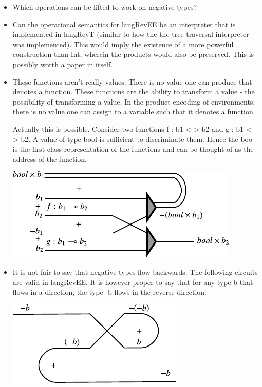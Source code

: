 \documentclass[preprint]{sigplanconf}
\begin{document}
{\begin{itemize}
\item Which operations can be lifted to work on negative types?

\item Can the operational semantics for {{langRevEE}} be an
  interpreter that is implemented in {{langRevT}} (similar to how the
  the tree traversal interpreter was implemented). This would imply
  the existence of a more powerful construction than Int, wherein the
  products would also be preserved. This is possibly worth a paper in
  itself.

\item These functions aren't really values. There is no value one can
  produce that denotes a function. These functions are the ability to
  transform a value - the possibility of transforming a value.  In the
  product encoding of environments, there is no value one can assign
  to a variable such that it denotes a function.


Actually this is possible. Consider two functions {{f : b1 <-> b2}}
and {{g : b1 <-> b2}}. A value of type {{bool}} is sufficient to
discriminate them. Hence the {{boo}} is the first class representation
of the functions and can be thought of as the address of the function. 

\begin{center}
  \includegraphics{diagrams/dispatch.pdf}
\end{center}


\item It is not fair to say that negative types flow backwards. The
  following circuits are valid in {{langRevEE}}. It is however proper
  to say that for any type {{b}} that flows in a direction, the type
  {{-b}} flows in the reverse direction. 

\begin{center}
  \includegraphics{diagrams/neg_circuit1.pdf}
\end{center}


\end{itemize}}
\end{document}
